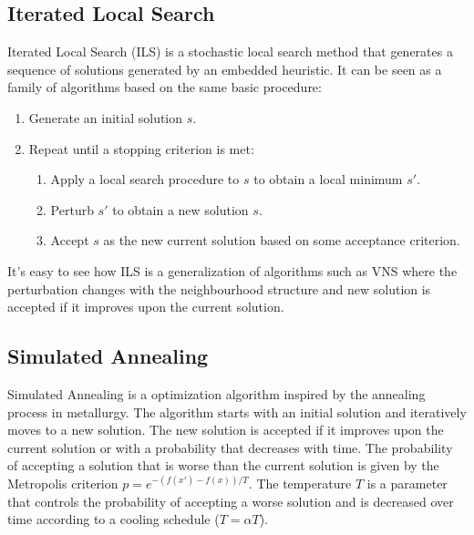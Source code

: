 \subsection{Iterated Local Search}
Iterated Local Search (ILS) is a stochastic local search method that generates a sequence of solutions generated by an embedded heuristic. It can be seen as a family of algorithms based on the same basic procedure:
\begin{enumerate}
    \item Generate an initial solution $s$.
    \item Repeat until a stopping criterion is met:
          \begin{enumerate}
              \item Apply a local search procedure to $s$ to obtain a local minimum $s'$.
              \item Perturb $s'$ to obtain a new solution $s$.
              \item Accept $s$ as the new current solution based on some acceptance criterion.
          \end{enumerate}
\end{enumerate}
It's easy to see how ILS is a generalization of algorithms such as VNS where the perturbation changes with the neighbourhood structure and new solution is accepted if it improves upon the current solution.


\subsection{Simulated Annealing}
Simulated Annealing is a optimization algorithm inspired by the annealing process in metallurgy. The algorithm starts with an initial solution and iteratively moves to a new solution. The new solution is accepted if it improves upon the current solution or with a probability that decreases with time. The probability of accepting a solution that is worse than the current solution is given by the Metropolis criterion $p = e^{-(f(x')-f(x))/T}$. The temperature $T$ is a parameter that controls the probability of accepting a worse solution and is decreased over time according to a cooling schedule ($T = \alpha T$).

